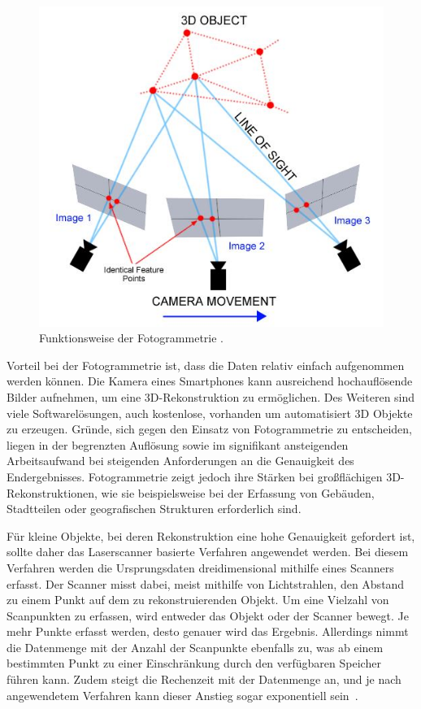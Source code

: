 \begin{figure}[H]
    \centering
    \includegraphics[width=0.7\linewidth]{images/photogrammetry.jpg}
    \caption{Funktionsweise der Fotogrammetrie \cite{.13.08.2024}.}
    \label{fig:photogammatry}
\end{figure}

Vorteil bei der Fotogrammetrie ist, dass die Daten relativ einfach aufgenommen werden
können. Die Kamera eines Smartphones kann ausreichend hochauflösende Bilder aufnehmen, um 
eine 3D-Rekonstruktion zu ermöglichen. Des Weiteren sind viele Softwarelösungen,
auch kostenlose, vorhanden um automatisiert 3D Objekte zu erzeugen.
Gründe, sich gegen den Einsatz von Fotogrammetrie zu entscheiden, 
liegen in der begrenzten Auflösung sowie im signifikant ansteigenden Arbeitsaufwand 
bei steigenden Anforderungen an die Genauigkeit des Endergebnisses. 
Fotogrammetrie zeigt jedoch ihre Stärken bei großflächigen 3D-Rekonstruktionen, 
wie sie beispielsweise bei der Erfassung von Gebäuden, Stadtteilen oder geografischen 
Strukturen erforderlich sind.


Für kleine Objekte, bei deren Rekonstruktion eine hohe Genauigkeit gefordert ist, 
sollte daher das Laserscanner basierte Verfahren angewendet werden. Bei diesem Verfahren werden
die Ursprungsdaten dreidimensional mithilfe eines Scanners erfasst. Der Scanner misst dabei, 
meist mithilfe von Lichtstrahlen, den Abstand zu einem Punkt auf dem zu 
rekonstruierenden Objekt. Um eine Vielzahl von Scanpunkten zu erfassen, 
wird entweder das Objekt oder der Scanner bewegt. Je mehr Punkte erfasst werden, 
desto genauer wird das Ergebnis. Allerdings nimmt die Datenmenge mit der Anzahl der 
Scanpunkte ebenfalls zu, was ab einem bestimmten Punkt zu einer Einschränkung durch den 
verfügbaren Speicher führen kann. Zudem steigt die Rechenzeit mit der Datenmenge an, 
und je nach angewendetem Verfahren kann dieser Anstieg sogar 
exponentiell sein~\cite{XiaoleiDu.2009}.

